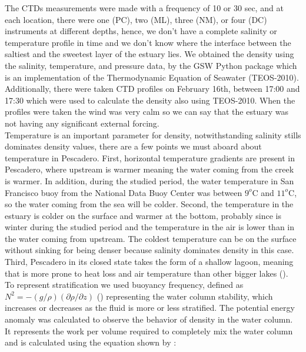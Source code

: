 \documentclass[11pt,letterpaper]{article}
\begin{document}
The CTDs measurements were made with a frequency of 10 or 30 sec, and at each location, there were one (PC), two (ML), three (NM), or four (DC) instruments at different depths, hence, we don't have a complete salinity or temperature profile in time and we don't know where the interface between the saltiest and the sweetest layer of the estuary lies. We obtained the density using the salinity, temperature, and pressure data, by the GSW Python package which is an implementation of the Thermodynamic Equation of Seawater (TEOS-2010).\\

Additionally, there were taken CTD profiles on February 16th, between 17:00 and 17:30 which were used to calculate the density also using TEOS-2010. When the profiles were taken the wind was very calm so we can say that the estuary was not having any significant external forcing. \\

Temperature is an important parameter for density, notwithstanding salinity stills dominates density values, there are a few points we must aboard about temperature in Pescadero. First, horizontal temperature gradients are present in Pescadero, where upstream is warmer meaning the water coming from the creek is warmer. In addition, during the studied period, the water temperature in San Francisco buoy from the National Data Buoy Center was between $9^o$C and $11^o$C, so the water coming from the sea will be colder. Second, the temperature in the estuary is colder on the surface and warmer at the bottom, probably since is winter during the studied period and the temperature in the air is lower than in the water coming from upstream. The coldest temperature can be on the surface without sinking for being denser because salinity dominates density in this case. Third, Pescadero in its closed state takes the form of a shallow lagoon, meaning that is more prone to heat loss and air temperature than other bigger lakes (\cite{peeters2009currents}).\\

To represent stratification we used buoyancy frequency, defined as $N^2 = -(g/\rho)(\partial \rho/\partial z)$ (\cite{kundu2002fluid}) representing the water column stability, which increases or decreases as the fluid is more or less stratified. The potential energy anomaly was calculated to observe the behavior of density in the water column. It represents the work per volume required to completely mix the water column and is calculated using the equation shown by \citeauthor{simpson1990tidal}: 
\end{document}
